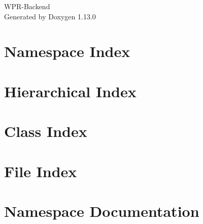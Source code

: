 \documentclass[twoside]{book}
\newcommand{\+}{\discretionary{\mbox{\scriptsize$\hookleftarrow$}}{}{}}
\newcommand{\clearemptydoublepage}{%
    \newpage{\pagestyle{empty}\cleardoublepage}%
  }
\begin{document}
  \raggedbottom
    \hypersetup{pageanchor=false,
                bookmarksnumbered=true,
                pdfencoding=unicode
               }
  \begin{titlepage}
  \vspace*{7cm}
  \begin{center}%
  {\Large WPR-\/\+Backend}\\
  \vspace*{1cm}
  {\large Generated by Doxygen 1.13.0}\\
  \end{center}
  \end{titlepage}
  \clearemptydoublepage
  \tableofcontents
  \clearemptydoublepage
  \hypersetup{pageanchor=true}
\chapter{Namespace Index}

\chapter{Hierarchical Index}

\chapter{Class Index}

\chapter{File Index}

\chapter{Namespace Documentation}

















\end{document}
